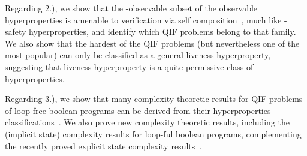 \documentclass[]{eptcs}
\begin{document}
Regarding 2.), we show that the -observable subset of the
observable hyperproperties is amenable to verification via self
composition~\cite{barthe:csfw04,darvas:spc05,terauchi:sas05,naumann:esorics06,unno:plas2006},
much like -safety hyperproperties, and identify which QIF problems
belong to that family.  We also show that the hardest of the QIF
problems (but nevertheless one of the most popular) can only be
classified as a general liveness hyperproperty, suggesting that
liveness hyperproperty is a quite permissive class of hyperproperties.

Regarding 3.), we show that many complexity theoretic results for QIF
problems of loop-free boolean programs can be derived from their
hyperproperties
classifications~\cite{DBLP:conf/csfw/YasuokaT10,DBLP:conf/esorics/YasuokaT10}.
We also prove new complexity theoretic results, including the
(implicit state) complexity results for loop-ful boolean programs,
complementing the recently proved explicit state complexity
results~\cite{DBLP:conf/csfw/CernyCH11}.
\end{document}
